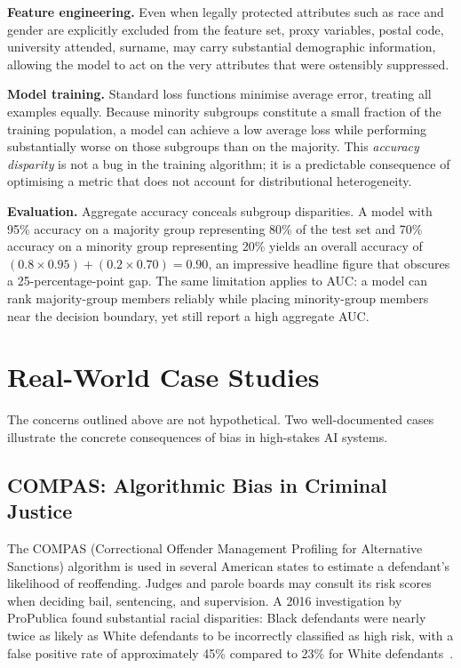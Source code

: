 \textbf{Feature engineering.}  Even when legally protected attributes such
as race and gender are explicitly excluded from the feature set, proxy
variables, postal code, university attended, surname, may carry substantial
demographic information, allowing the model to act on the very attributes
that were ostensibly suppressed.

\textbf{Model training.}  Standard loss functions minimise average error,
treating all examples equally.  Because minority subgroups constitute a
small fraction of the training population, a model can achieve a low average
loss while performing substantially worse on those subgroups than on the
majority.  This \emph{accuracy disparity} is not a bug in the training
algorithm; it is a predictable consequence of optimising a metric that does
not account for distributional heterogeneity.

\textbf{Evaluation.}  Aggregate accuracy conceals subgroup disparities.
A model with 95\% accuracy on a majority group representing 80\% of the test
set and 70\% accuracy on a minority group representing 20\% yields an overall
accuracy of $(0.8 \times 0.95) + (0.2 \times 0.70) = 0.90$, an impressive
headline figure that obscures a 25-percentage-point gap.  The same limitation
applies to AUC: a model can rank majority-group members reliably while placing
minority-group members near the decision boundary, yet still report a high
aggregate AUC.

\section{Real-World Case Studies}
\label{sec:real_world_bias}

The concerns outlined above are not hypothetical.  Two well-documented
cases illustrate the concrete consequences of bias in high-stakes AI systems.

\subsection{COMPAS: Algorithmic Bias in Criminal Justice}
\label{subsec:compas}

The COMPAS (Correctional Offender Management Profiling for Alternative
Sanctions) algorithm is used in several American states to estimate a
defendant's likelihood of reoffending.  Judges and parole boards may consult
its risk scores when deciding bail, sentencing, and supervision.  A 2016
investigation by ProPublica found substantial racial disparities: Black
defendants were nearly twice as likely as White defendants to be incorrectly
classified as high risk, with a false positive rate of approximately 45\%
compared to 23\% for White defendants~\cite{propublica2016}.

